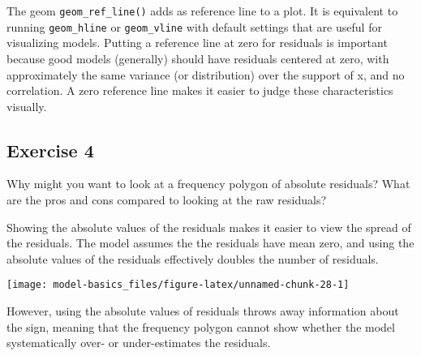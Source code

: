 \documentclass[]{book}
\newenvironment{Shaded}{\begin{snugshade}}{\end{snugshade}}
\newcommand{\DataTypeTok}[1]{\textcolor[rgb]{0.13,0.29,0.53}{#1}}
\newcommand{\FloatTok}[1]{\textcolor[rgb]{0.00,0.00,0.81}{#1}}
\newcommand{\KeywordTok}[1]{\textcolor[rgb]{0.13,0.29,0.53}{\textbf{#1}}}
\newcommand{\NormalTok}[1]{#1}
\newcommand{\OperatorTok}[1]{\textcolor[rgb]{0.81,0.36,0.00}{\textbf{#1}}}
\newcommand{\StringTok}[1]{\textcolor[rgb]{0.31,0.60,0.02}{#1}}
\theoremstyle{definition}
\theoremstyle{definition}
\theoremstyle{definition}
\theoremstyle{remark}
\begin{document}
The geom \texttt{geom\_ref\_line()} adds as reference line to a plot. It
is equivalent to running \texttt{geom\_hline} or \texttt{geom\_vline}
with default settings that are useful for visualizing models. Putting a
reference line at zero for residuals is important because good models
(generally) should have residuals centered at zero, with approximately
the same variance (or distribution) over the support of x, and no
correlation. A zero reference line makes it easier to judge these
characteristics visually.

\hypertarget{exercise-4-33}{%
\subsection{Exercise 4}\label{exercise-4-33}}

Why might you want to look at a frequency polygon of absolute residuals?
What are the pros and cons compared to looking at the raw residuals?

Showing the absolute values of the residuals makes it easier to view the
spread of the residuals. The model assumes the the residuals have mean
zero, and using the absolute values of the residuals effectively doubles
the number of residuals.

\begin{Shaded}
\end{Shaded}

\begin{center}\texttt{[image: model-basics\_files/figure-latex/unnamed-chunk-28-1]} \end{center}

However, using the absolute values of residuals throws away information
about the sign, meaning that the frequency polygon cannot show whether
the model systematically over- or under-estimates the residuals.
\end{document}
